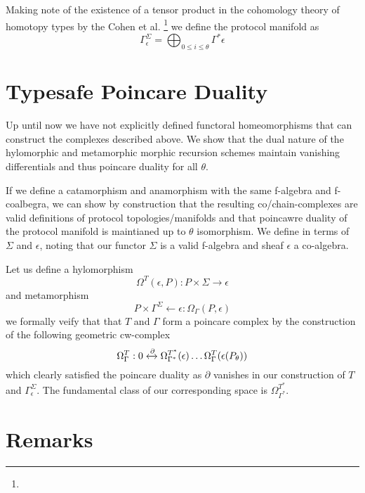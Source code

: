 \documentclass{article}
\begin{document}
Making note of the existence of a tensor product in the cohomology theory of homotopy types by the Cohen et al. \footnote{} we define the protocol manifold as 
\begin{equation} \label{eq1}
\Gamma^{\Sigma}_\epsilon = \bigoplus_{0 \leq i \leq \theta} \Gamma^* \epsilon
\end{equation} \label{eq1}

\section{Typesafe Poincare Duality}
Up until now we have not explicitly defined functoral homeomorphisms that can construct the complexes described above. We show that the dual nature of the hylomorphic and metamorphic morphic recursion schemes maintain vanishing differentials and thus poincare duality for all $\theta$.

If we define a catamorphism and anamorphism with the same f-algebra and f-coalbegra, we can show by construction that the resulting co/chain-complexes are valid definitions of protocol topologies/manifolds and that poincawre duality of the protocol manifold is maintianed up to $\theta$ isomorphism. We define in terms of $\Sigma$ and $\epsilon$, noting that our functor $\Sigma$ is a valid f-algebra and sheaf $\epsilon$ a co-algebra.

Let us define a hylomorphism
\begin{equation} \label{eq1}
\Omega^T(\epsilon, P): P \times \Sigma \rightarrow \epsilon
\end{equation} \label{eq1}
and metamorphism
\begin{equation} \label{eq1}
P \times \Gamma^\Sigma \leftarrow \epsilon :\Omega_\Gamma(P, \epsilon)
\end{equation} \label{eq1}
we formally veify that that $T$ and $\Gamma$ form a poincare complex by the construction of the following geometric cw-complex
\begin{equation} \label{eq1}
\Omega^T_\Gamma: 0 \xleftrightarrow{\partial} \Omega^{T^*}_{\Gamma^*}(\epsilon) \dots \Omega^T_\Gamma (\epsilon(P_\theta))
\end{equation} \label{eq1}
which clearly satisfied the poincare duality as $\partial$ vanishes in our construction of $T$ and $\Gamma^{\Sigma}_\epsilon$. The fundamental class of our corresponding space is $\Omega^{T^*}_{\Gamma^*}$.

\section{Remarks}
 

\end{document}
